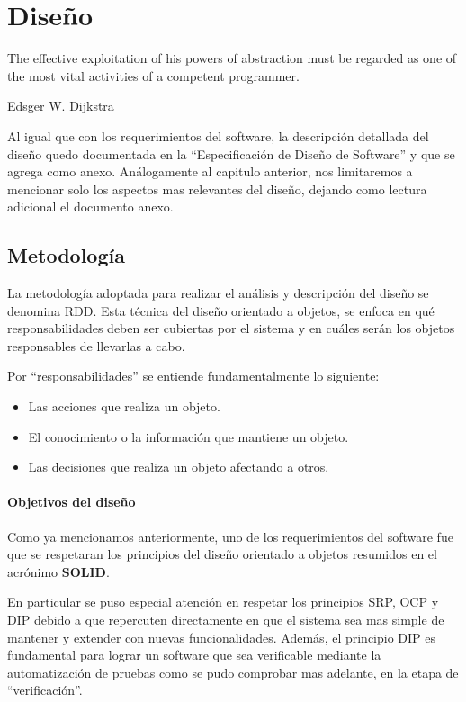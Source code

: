 \chapter{Dise\~no}
\epigraph{The effective exploitation of his powers of abstraction must be
regarded as one of the most vital activities of a competent programmer.}%
{Edsger W. Dijkstra}

Al igual que con los requerimientos del software, la descripci\'on detallada del
dise\~no quedo documentada en la ``Especificaci\'on de Dise\~no de Software'' y
que se agrega como anexo. An\'alogamente al capitulo anterior, nos limitaremos
a mencionar solo los aspectos mas relevantes del dise\~no, dejando como lectura
adicional el documento anexo.

\section{Metodolog\'ia}

La metodolog\'ia adoptada para realizar el an\'alisis y descripci\'on del
dise\~no se denomina \ac{RDD}\cite{Wirfs03}. Esta t\'ecnica del dise\~no
orientado a objetos, se enfoca en qu\'e responsabilidades deben ser
cubiertas por el sistema y en cu\'ales ser\'an los objetos responsables de
llevarlas a cabo.

Por ``responsabilidades'' se entiende fundamentalmente lo siguiente:
\begin{itemize}
 \item Las acciones que realiza un objeto.
 \item El conocimiento o la informaci\'on que mantiene un objeto.
 \item Las decisiones que realiza un objeto afectando a otros.
\end{itemize}

\subsubsection{Objetivos del dise\~no}

Como ya mencionamos anteriormente, uno de los requerimientos del software fue
que se respetaran los principios del dise\~no orientado a objetos resumidos en
el acr\'onimo \textbf{SOLID}\cite{Martin00}.

En particular se puso especial atenci\'on en respetar los principios \ac{SRP}, 
\ac{OCP} y \ac{DIP} debido a que repercuten directamente en que el sistema sea
mas simple de mantener y extender con nuevas funcionalidades. Adem\'as, el
principio \ac{DIP} es fundamental para lograr un software que sea verificable
mediante la automatizaci\'on de pruebas como se pudo comprobar mas adelante, en
la etapa de ``verificaci\'on''.

